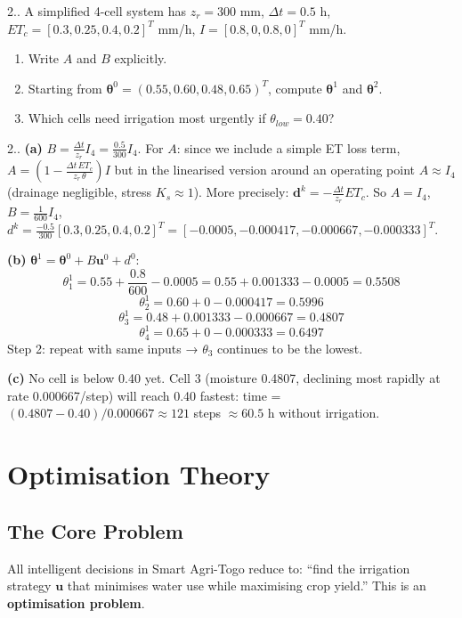 \documentclass[12pt,a4paper,openany]{book}
\newcounter{exoctr}[chapter]
\renewcommand{\theexoctr}{\thechapter.\arabic{exoctr}}
\newcommand{\bu}{\bm{u}}
\newcommand{\bth}{\bm{\theta}}
\begin{document}
\begin{exobox}{2.\theexoctr}
A simplified 4-cell system has $z_r=300$ mm, $\Delta t=0.5$ h, $ET_c=[0.3,0.25,0.4,0.2]^T$ mm/h, $I=[0.8,0,0.8,0]^T$ mm/h.
\begin{enumerate}[label=(\alph*)]
  \item Write $A$ and $B$ explicitly.
  \item Starting from $\bth^0=(0.55,0.60,0.48,0.65)^T$, compute $\bth^1$ and $\bth^2$.
  \item Which cells need irrigation most urgently if $\theta_{low}=0.40$?
\end{enumerate}
\end{exobox}

\begin{solbox}{2.\theexoctr}
\textbf{(a)} $B=\frac{\Delta t}{z_r}I_4=\frac{0.5}{300}I_4$. For $A$: since we include a simple ET loss term, $A=(1-\frac{\Delta t\,ET_c}{z_r\,\theta})I$ but in the linearised version around an operating point $A\approx I_4$ (drainage negligible, stress $K_s\approx 1$). More precisely: $\bm{d}^k = -\frac{\Delta t}{z_r}ET_c$. So $A=I_4$, $B=\frac{1}{600}I_4$, $d^k=\frac{-0.5}{300}[0.3,0.25,0.4,0.2]^T=[-0.0005,-0.000417,-0.000667,-0.000333]^T$.

\textbf{(b)} $\bth^1=\bth^0+B\bu^0+d^0$:
\[\theta_1^1=0.55+\frac{0.8}{600}-0.0005=0.55+0.001333-0.0005=0.5508\]
\[\theta_2^1=0.60+0-0.000417=0.5996\]
\[\theta_3^1=0.48+0.001333-0.000667=0.4807\]
\[\theta_4^1=0.65+0-0.000333=0.6497\]
Step 2: repeat with same inputs → $\theta_3$ continues to be the lowest.

\textbf{(c)} No cell is below 0.40 yet. Cell 3 (moisture 0.4807, declining most rapidly at rate 0.000667/step) will reach 0.40 fastest: time = $(0.4807-0.40)/0.000667\approx121$ steps $\approx 60.5$ h without irrigation.
\end{solbox}

\chapter{Optimisation Theory}
\label{chap:optim}

\section{The Core Problem}

All intelligent decisions in Smart Agri-Togo reduce to: ``find the irrigation strategy $\bu$ that minimises water use while maximising crop yield.'' This is an \textbf{optimisation problem}.
\end{document}
